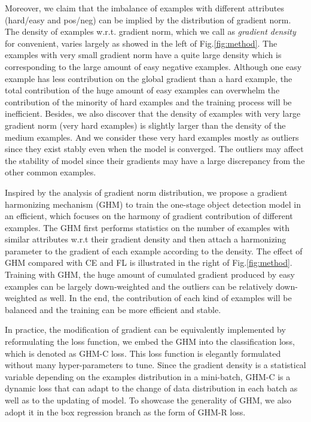 \documentclass[letterpaper]{article} %
\begin{document}
Moreover, we claim that the imbalance of examples with different attributes (hard/easy and pos/neg) can be implied by the distribution of gradient norm. The density of examples w.r.t. gradient norm, which we call as \textit{gradient density} for convenient, varies largely as showed in the left of Fig.\ref{fig:method}. The examples with very small gradient norm have a quite large density which is corresponding to the large amount of easy negative examples. Although one easy example has less contribution on the global gradient than a hard example, the total contribution of the huge amount of easy examples can overwhelm the contribution of the minority of hard examples and the training process will be inefficient. Besides, we also discover that the density of examples with very large gradient norm (very hard examples) is slightly larger than the density of the medium examples. And we consider these very hard examples mostly as outliers since they exist stably even when the model is converged. The outliers may affect the stability of model since their gradients may have a large discrepancy from the other common examples.

Inspired by the analysis of gradient norm distribution, we propose a gradient harmonizing mechanism (GHM) to train the one-stage object detection model in an efficient, which focuses on the harmony of gradient contribution of different examples. The GHM first performs statistics on the number of examples with similar attributes w.r.t their gradient density and then attach a harmonizing parameter to the gradient of each example according to the density. The effect of GHM compared with CE and FL is illustrated in the right of Fig.\ref{fig:method}. Training with GHM, the huge amount of cumulated gradient produced by easy examples can be largely down-weighted and the outliers can be relatively down-weighted as well. In the end, the contribution of each kind of examples will be balanced and the training can be more efficient and stable.  

In practice, the modification of gradient can be equivalently implemented by reformulating the loss function, we embed the GHM into the classification loss, which is denoted as GHM-C loss. This loss function is elegantly formulated without many hyper-parameters to tune. Since the gradient density is a statistical variable depending on the examples distribution in a mini-batch, GHM-C is a dynamic loss that can adapt to the change of data distribution in each batch as well as to the updating of model. To showcase the generality of GHM, we also adopt it in the box regression branch as the form of GHM-R loss.
\end{document}
